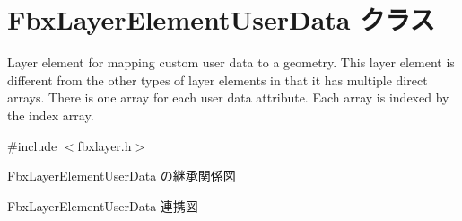 \hypertarget{class_fbx_layer_element_user_data}{}\section{Fbx\+Layer\+Element\+User\+Data クラス}
\label{class_fbx_layer_element_user_data}


Layer element for mapping custom user data to a geometry. This layer element is different from the other types of layer elements in that it has multiple direct arrays. There is one array for each user data attribute. Each array is indexed by the index array.  




{\ttfamily \#include $<$fbxlayer.\+h$>$}



Fbx\+Layer\+Element\+User\+Data の継承関係図


Fbx\+Layer\+Element\+User\+Data 連携図
